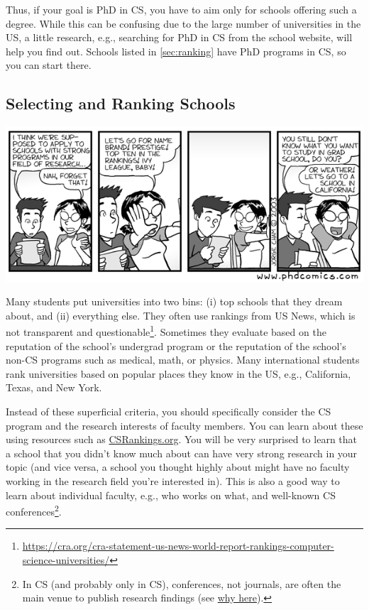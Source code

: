 \documentclass[oneside,11pt,dvipsnames]{book}
\begin{document}
Thus, if your goal is PhD in CS, you have to aim only for schools offering such a degree.  %
While this can be confusing due to the large number of universities in the US, a little research, e.g., searching for PhD in CS from the school website, will help you find out. Schools listed in \autoref{sec:ranking} have PhD programs in CS, so you can start there.


\subsection{Selecting and Ranking Schools}\label{sec:selecting-ranking-schools}
\begin{center}
  \includegraphics[scale=0.5]{files/c1.png}
\end{center}

Many students put universities into two bins: (i) top schools that they dream about, and (ii) everything else.  They often use rankings from US News, which is not transparent and questionable\footnote{\url{https://cra.org/cra-statement-us-news-world-report-rankings-computer-science-universities/}}.  Sometimes they evaluate based on the reputation of the school's undergrad program or the reputation of the school's non-CS programs such as medical, math, or physics.
Many international students rank universities based on popular places they know in the US, e.g., California, Texas, and New York.

Instead of these superficial criteria, you should specifically consider the CS program and the research interests of faculty members.
You can learn about these using resources such as \href{https://csrankings.org}{CSRankings.org}. You will be very surprised to learn that a school that you didn't know much about can have very strong research in your topic (and vice versa, a school you thought highly about might have no faculty working in the research field you're interested in). This is also a good way to learn about individual faculty, e.g., who works on what, and well-known CS conferences\footnote{In CS (and probably only in CS), conferences, not journals, are often the main venue to publish research findings (see \href{https://homes.cs.washington.edu/~mernst/advice/conferences-vs-journals.html}{why here}).}. %
\end{document}
